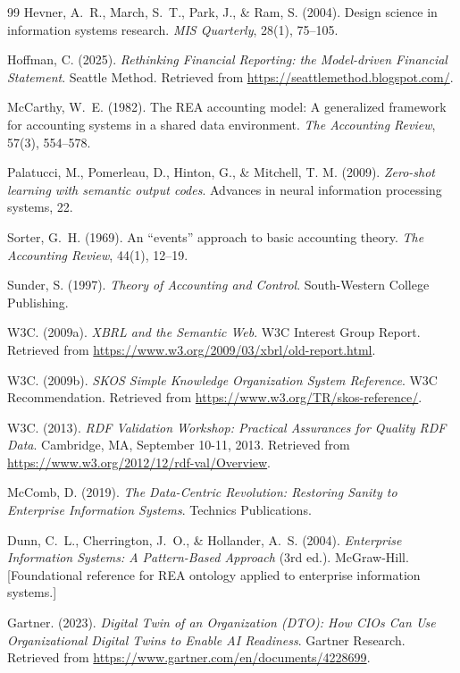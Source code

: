 \documentclass[12pt, a4paper]{article}
\begin{document}
\begin{thebibliography}{99}
Hevner, A.~R., March, S.~T., Park, J., \& Ram, S. (2004). Design science in information systems research. \textit{MIS Quarterly}, 28(1), 75--105.

Hoffman, C. (2025). \textit{Rethinking Financial Reporting: the Model-driven Financial Statement}. Seattle Method. Retrieved from \url{https://seattlemethod.blogspot.com/}.

McCarthy, W.~E. (1982). The REA accounting model: A generalized framework for accounting systems in a shared data environment. \textit{The Accounting Review}, 57(3), 554--578.

Palatucci, M., Pomerleau, D., Hinton, G., \& Mitchell, T. M. (2009). \textit{Zero-shot learning with semantic output codes}. Advances in neural information processing systems, 22.

Sorter, G.~H. (1969). An ``events'' approach to basic accounting theory. \textit{The Accounting Review}, 44(1), 12--19.

Sunder, S. (1997). \textit{Theory of Accounting and Control}. South-Western College Publishing.

W3C. (2009a). \textit{XBRL and the Semantic Web}. W3C Interest Group Report. Retrieved from \url{https://www.w3.org/2009/03/xbrl/old-report.html}.

W3C. (2009b). \textit{SKOS Simple Knowledge Organization System Reference}. W3C Recommendation. Retrieved from \url{https://www.w3.org/TR/skos-reference/}.

W3C. (2013). \textit{RDF Validation Workshop: Practical Assurances for Quality RDF Data}. Cambridge, MA, September 10-11, 2013. Retrieved from \url{https://www.w3.org/2012/12/rdf-val/Overview}.

McComb, D. (2019). \textit{The Data-Centric Revolution: Restoring Sanity to Enterprise Information Systems}. Technics Publications.

Dunn, C.~L., Cherrington, J.~O., \& Hollander, A.~S. (2004). \textit{Enterprise Information Systems: A Pattern-Based Approach} (3rd ed.). McGraw-Hill. [Foundational reference for REA ontology applied to enterprise information systems.]

Gartner. (2023). \textit{Digital Twin of an Organization (DTO): How CIOs Can Use Organizational Digital Twins to Enable AI Readiness}. Gartner Research. Retrieved from \url{https://www.gartner.com/en/documents/4228699}.

\end{thebibliography}
\end{document}
